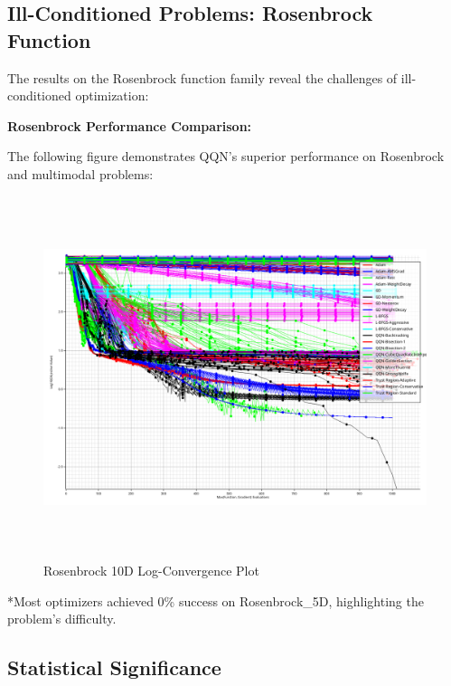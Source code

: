 \hypertarget{ill-conditioned-problems-rosenbrock-function}{%
\subsection{Ill-Conditioned Problems: Rosenbrock Function}\label{ill-conditioned-problems-rosenbrock-function}}

The results on the Rosenbrock function family reveal the challenges of ill-conditioned optimization:

\textbf{Rosenbrock Performance Comparison:}

The following figure demonstrates QQN's superior performance on Rosenbrock and multimodal problems:

\begin{figure}
\centering
\includegraphics[width=\textwidth,height=4.16667in]{../results/full_all_optimizers_20250728_133324/convergence_Rosenbrock_10D_log.png}
\caption{Rosenbrock 10D Log-Convergence Plot}
\end{figure}



*Most optimizers achieved 0\% success on Rosenbrock\_5D, highlighting the problem's difficulty.

\hypertarget{statistical-significance}{%
\subsection{Statistical Significance}\label{statistical-significance}}

